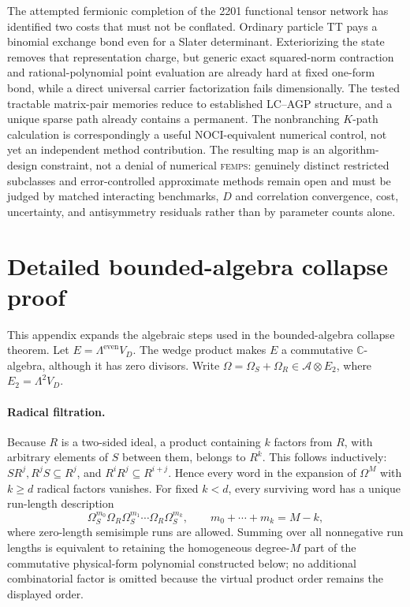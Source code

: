 \documentclass[11pt]{article}
\theoremstyle{definition}
\newcommand{\FEMPS}{\textnormal{\textsc{femps}}}
\begin{document}
The attempted fermionic completion of the 2201 functional tensor network has
identified two costs that must not be conflated.  Ordinary particle TT pays a
binomial exchange bond even for a Slater determinant.  Exteriorizing the state
removes that representation charge, but generic exact squared-norm contraction
and rational-polynomial point evaluation are already hard at fixed one-form
bond, while a direct universal carrier
factorization fails dimensionally.  The tested tractable matrix-pair memories
reduce to established LC--AGP structure, and a unique sparse path already
contains a permanent.  The nonbranching $K$-path calculation is correspondingly
a useful NOCI-equivalent numerical control, not yet an independent method
contribution.  The resulting map is an algorithm-design constraint, not a
denial of numerical \FEMPS{}: genuinely distinct restricted subclasses and
error-controlled approximate methods remain open and must be judged by matched
interacting benchmarks, $D$ and correlation convergence, cost, uncertainty,
and antisymmetry residuals rather than by parameter counts alone.

\appendix
\section{Detailed bounded-algebra collapse proof}
\label{app:wm-proof}

This appendix expands the algebraic steps used in the bounded-algebra collapse
theorem.  Let $E=\Lambda^{\mathrm{even}}V_D$.  The wedge product makes $E$ a
commutative $\mathbb C$-algebra, although it has zero divisors.  Write
$\Omega=\Omega_S+\Omega_R\in\mathcal A\otimes E_2$, where $E_2=\Lambda^2V_D$.

\paragraph{Radical filtration.}
Because $R$ is a two-sided ideal, a product containing $k$ factors from $R$,
with arbitrary elements of $S$ between them, belongs to $R^k$.  This follows
inductively: $SR^j,R^jS\subseteq R^j$, and
$R^iR^j\subseteq R^{i+j}$.  Hence every word in the expansion of $\Omega^M$
with $k\ge d$ radical factors vanishes.  For fixed $k<d$, every surviving word
has a unique run-length description
\[
 \Omega_S^{m_0}\Omega_R\Omega_S^{m_1}\cdots
 \Omega_R\Omega_S^{m_k},\qquad
 m_0+\cdots+m_k=M-k,
\]
where zero-length semisimple runs are allowed.  Summing over all nonnegative
run lengths is equivalent to retaining the homogeneous degree-$M$ part of the
commutative physical-form polynomial constructed below; no additional
combinatorial factor is omitted because the virtual product order remains the
displayed order.
\end{document}

